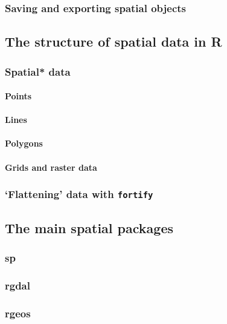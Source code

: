 \documentclass[]{article}
\begin{document}
\subsubsection{Saving and exporting spatial objects}

\subsection{The structure of spatial data in R}

\subsubsection{Spatial* data}

\paragraph{Points}

\paragraph{Lines}

\paragraph{Polygons}

\paragraph{Grids and raster data}

\subsubsection{`Flattening' data with \texttt{fortify}}

\subsection{The main spatial packages}

\subsubsection{sp}

\subsubsection{rgdal}

\subsubsection{rgeos}
\end{document}
